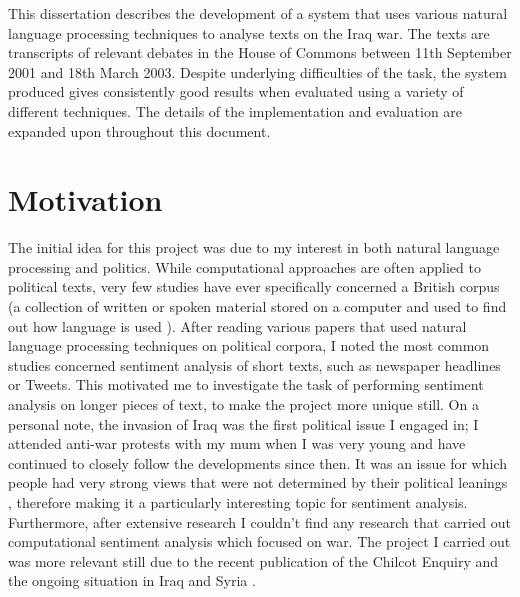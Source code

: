 \documentclass[12pt,a4paper,twoside,openright]{report}
\begin{document}
\begin{comment}
\newpage
Introduction and preparation - 26\%

The Introduction should explain the principal motivation for the project. Show how the work fits into the broad area of surrounding Computer Science and give a brief survey of previous related work. It should generally be unnecessary to quote at length from technical papers or textbooks. If a simple bibliographic reference is insufficient, consign any lengthy quotation to an appendix.
\end{comment}

This dissertation describes the development of a system that uses various natural language processing techniques to analyse texts on the Iraq war. The texts are transcripts of relevant debates in the House of Commons between 11th September 2001 and 18th March 2003. Despite underlying difficulties of the task, the system produced gives consistently good results when evaluated using a variety of different techniques. The details of the implementation and evaluation are expanded upon throughout this document.

\section{Motivation}

The initial idea for this project was due to my interest in both natural language processing and politics. While computational approaches are often applied to political texts, very few studies have ever specifically concerned a British corpus (a collection of written or spoken material stored on a computer and used to find out how language is used \cite{corpus_definition}). After reading various papers that used natural language processing techniques on political corpora, I noted the most common studies concerned sentiment analysis of short texts, such as newspaper headlines or Tweets. This motivated me to investigate the task of performing sentiment analysis on longer pieces of text, to make the project more unique still.
\newline
\newline
On a personal note, the invasion of Iraq was the first political issue I engaged in; I attended anti-war protests with my mum when I was very young and have continued to closely follow the developments since then. It was an issue for which people had very strong views that were not determined by their political leanings \cite{mp_votes_bbc}, therefore making it a particularly interesting topic for sentiment analysis. Furthermore, after extensive research I couldn't find any research that carried out computational sentiment analysis which focused on war. The project I carried out was more relevant still due to the recent publication of the Chilcot Enquiry \cite{chilcot2016report} and the ongoing situation in Iraq and Syria \cite{syria_iraq_air_strikes}.
\end{document}

